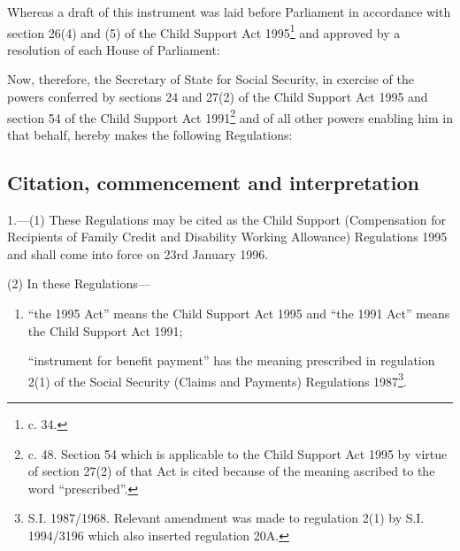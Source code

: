 \documentclass[12pt,a4paper]{article}
\title{\regstitle}
\author{S.I. 1995 No. 3263}
\date{Made 15th December 1995\\Coming into force 23rd January 1996
}
\begin{document}
\maketitle


\medskip

\noindent
Whereas a draft of this instrument was laid before Parliament in accordance with section 26(4) and (5) of the Child Support Act 1995\footnote{ c. 34.} and approved by a resolution of each House of Parliament:

 Now, therefore, the Secretary of State for Social Security, in exercise of the powers conferred by sections 24 and 27(2) of the Child Support Act 1995 and section 54 of the Child Support Act 1991\footnote{ c. 48. Section 54 which is applicable to the Child Support Act 1995 by virtue of section 27(2) of that Act is cited because of the meaning ascribed to the word “prescribed”.} and of all other powers enabling him in that behalf, hereby makes the following Regulations:

{\sloppy

\tableofcontents

}

\setcounter{secnumdepth}{-2}

\subsection[1. Citation, commencement and interpretation]{Citation, commencement and interpretation}

1.—(1) These Regulations may be cited as the Child Support (Compensation for Recipients of Family Credit and Disability Working Allowance) Regulations 1995 and shall come into force on 23rd January 1996.

(2) In these Regulations—
\begin{enumerate}\item[]
“the 1995 Act” means the Child Support Act 1995 and “the 1991 Act” means the Child Support Act 1991;

“instrument for benefit payment” has the meaning prescribed in regulation 2(1) of the Social Security (Claims and Payments) Regulations 1987\footnote{\frenchspacing S.I. 1987/1968. Relevant amendment was made to regulation 2(1) by S.I. 1994/3196 which also inserted regulation 20A.}.
\end{enumerate}
\end{document}
